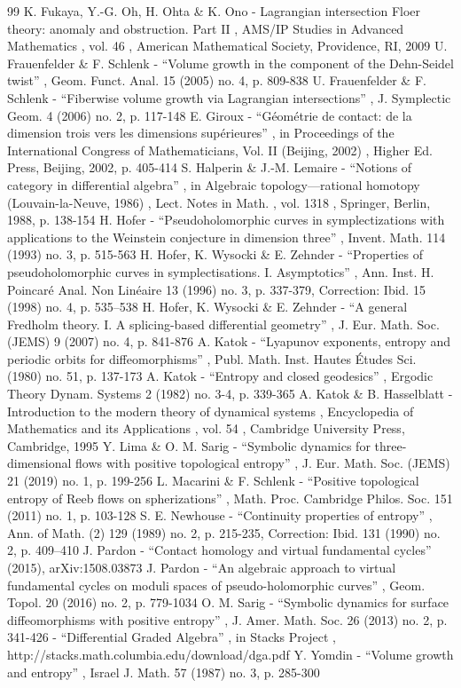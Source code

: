 \documentclass[10pt]{amsart}
\theoremstyle{plain}
\theoremstyle{definition}
\numberwithin{equation}{subsection}
\begin{document}
\begin{thebibliography}{99}
 K. Fukaya, Y.-G. Oh, H. Ohta \& K. Ono - Lagrangian intersection Floer theory: anomaly and obstruction. Part II , AMS/IP Studies in Advanced Mathematics , vol. 46 , American Mathematical Society, Providence, RI, 2009
 U. Frauenfelder \& F. Schlenk - “Volume growth in the component of the Dehn-Seidel twist” , Geom. Funct. Anal. 15 (2005) no. 4, p. 809-838
 U. Frauenfelder \& F. Schlenk - “Fiberwise volume growth via Lagrangian intersections” , J. Symplectic Geom. 4 (2006) no. 2, p. 117-148
 E. Giroux - “Géométrie de contact: de la dimension trois vers les dimensions supérieures” , in Proceedings of the International Congress of Mathematicians, Vol. II (Beijing, 2002) , Higher Ed. Press, Beijing, 2002, p. 405-414
 S. Halperin \& J.-M. Lemaire - “Notions of category in differential algebra” , in Algebraic topology—rational homotopy (Louvain-la-Neuve, 1986) , Lect. Notes in Math. , vol. 1318 , Springer, Berlin, 1988, p. 138-154
 H. Hofer - “Pseudoholomorphic curves in symplectizations with applications to the Weinstein conjecture in dimension three” , Invent. Math. 114 (1993) no. 3, p. 515-563
 H. Hofer, K. Wysocki \& E. Zehnder - “Properties of pseudoholomorphic curves in symplectisations. I. Asymptotics” , Ann. Inst. H. Poincaré Anal. Non Linéaire 13 (1996) no. 3, p. 337-379, Correction: Ibid. 15 (1998) no. 4, p. 535–538
 H. Hofer, K. Wysocki \& E. Zehnder - “A general Fredholm theory. I. A splicing-based differential geometry” , J. Eur. Math. Soc. (JEMS) 9 (2007) no. 4, p. 841-876
 A. Katok - “Lyapunov exponents, entropy and periodic orbits for diffeomorphisms” , Publ. Math. Inst. Hautes Études Sci. (1980) no. 51, p. 137-173
 A. Katok - “Entropy and closed geodesics” , Ergodic Theory Dynam. Systems 2 (1982) no. 3-4, p. 339-365
 A. Katok \& B. Hasselblatt - Introduction to the modern theory of dynamical systems , Encyclopedia of Mathematics and its Applications , vol. 54 , Cambridge University Press, Cambridge, 1995
 Y. Lima \& O. M. Sarig - “Symbolic dynamics for three-dimensional flows with positive topological entropy” , J. Eur. Math. Soc. (JEMS) 21 (2019) no. 1, p. 199-256
 L. Macarini \& F. Schlenk - “Positive topological entropy of Reeb flows on spherizations” , Math. Proc. Cambridge Philos. Soc. 151 (2011) no. 1, p. 103-128
 S. E. Newhouse - “Continuity properties of entropy” , Ann. of Math. (2) 129 (1989) no. 2, p. 215-235, Correction: Ibid. 131 (1990) no. 2, p. 409–410
 J. Pardon - “Contact homology and virtual fundamental cycles” (2015), arXiv:1508.03873
 J. Pardon - “An algebraic approach to virtual fundamental cycles on moduli spaces of pseudo-holomorphic curves” , Geom. Topol. 20 (2016) no. 2, p. 779-1034
 O. M. Sarig - “Symbolic dynamics for surface diffeomorphisms with positive entropy” , J. Amer. Math. Soc. 26 (2013) no. 2, p. 341-426
 - “Differential Graded Algebra” , in Stacks Project , http://stacks.math.columbia.edu/download/dga.pdf
 Y. Yomdin - “Volume growth and entropy” , Israel J. Math. 57 (1987) no. 3, p. 285-300
\end{thebibliography}
\end{document}
